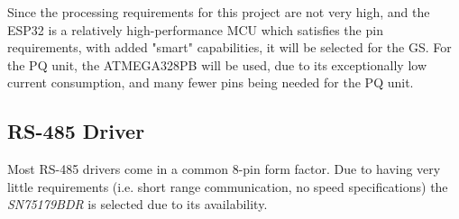 Since the processing requirements for this project are not very high, and the ESP32 is a relatively high-performance MCU which satisfies the pin requirements, with added "smart" capabilities, it will be selected for the GS. For the PQ unit, the ATMEGA328PB will be used, due to its exceptionally low current consumption, and many fewer pins being needed for the PQ unit.

\subsection{RS-485 Driver}
Most RS-485 drivers come in a common 8-pin form factor. Due to having very little requirements (i.e. short range communication, no speed specifications) the \textit{SN75179BDR} is selected due to its availability.